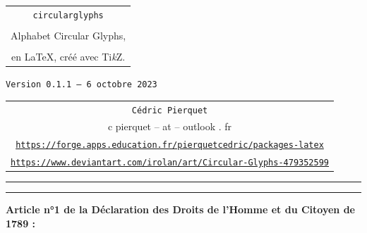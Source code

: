 \documentclass[french,11pt,a4paper]{article}
\providecommand\tikzlogo{Ti\textit{k}Z}
\let\TikZ\tikzlogo
\def\TPversion{0.1.1}
\def\TPdate{6 octobre 2023}
\begin{document}
\pagestyle{fancy}

\thispagestyle{empty}

\begin{center}
	\begin{minipage}{0.75\linewidth}
	\begin{tcolorbox}[colframe=yellow,colback=yellow!15]
		\begin{center}
			\begin{tabular}{c}
				{\Huge \texttt{circularglyphs}}\\
				\\
				{\LARGE Alphabet Circular Glyphs,} \\
				\\
				{\LARGE en \LaTeX, créé avec \TikZ.} \\
			\end{tabular}
			
			\medskip
			
			{\small \texttt{Version \TPversion{} -- \TPdate}}
		\end{center}
	\end{tcolorbox}
\end{minipage}
\end{center}

\vspace*{1mm}

\begin{center}
	\begin{tabular}{c}
	\texttt{Cédric Pierquet}\\
	{\ttfamily c pierquet -- at -- outlook . fr}\\
	\texttt{\url{https://forge.apps.education.fr/pierquetcedric/packages-latex}}
	\\
	\texttt{\url{https://www.deviantart.com/irolan/art/Circular-Glyphs-479352599}}
\end{tabular}
\end{center}

\hrule


\hypertarget{matoc}{}

\tableofcontents

\vspace*{5mm}

\hrule

\vspace*{5mm}

\vfill

\textbf{Article n°1 de la Déclaration des Droits de l'Homme et du Citoyen de 1789 : }
\end{document}
